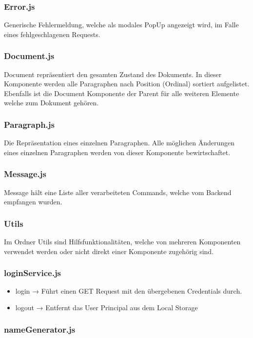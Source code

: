 \subsubsection*{Error.js}
Generische Fehlermeldung, welche als modales PopUp angezeigt wird, im Falle eines fehlgeschlagenen Requests.

\subsubsection*{Document.js}
Document repräsentiert den gesamten Zustand des Dokuments.
In dieser Komponente werden alle Paragraphen nach Position (Ordinal) sortiert aufgelistet.
Ebenfalls ist die Document Komponente der Parent für alle weiteren Elemente welche zum Dokument gehören.

\subsubsection*{Paragraph.js}
Die Repräsentation eines einzelnen Paragraphen.
Alle möglichen Änderungen eines einzelnen Paragraphen werden von dieser Komponente bewirtschaftet.


\subsubsection*{Message.js}
Message hält eine Liste aller verarbeiteten Commands, welche vom Backend empfangen wurden.

\subsubsection{Utils}
Im Ordner Utils sind Hilfsfunktionalitäten, welche von mehreren Komponenten verwendet werden oder nicht direkt einer Komponente zugehörig sind.

\subsubsection*{loginService.js}

\begin{itemize}
    \item login → Führt einen GET Request mit den übergebenen Credentials durch.
    \item logout → Entfernt das User Principal aus dem Local Storage
\end{itemize}

\subsubsection*{nameGenerator.js}

